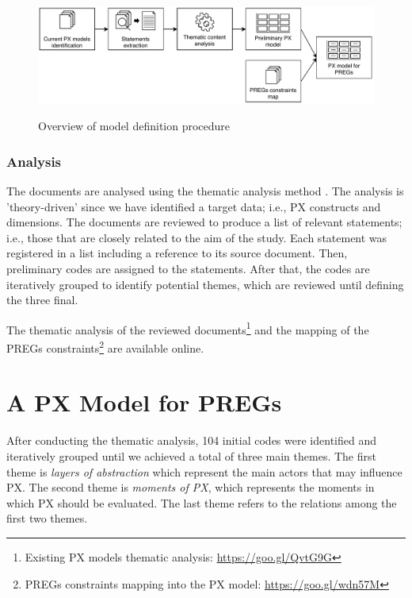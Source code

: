 \begin{figure}[bth]
\myfloatalign
{\includegraphics[width=\linewidth]{gfx/model/modelDefiniton}} \quad
\caption{Overview of model definition procedure}\label{fig:modelDefiniton}
\end{figure}

\subsubsection{Analysis}
The documents are analysed using the thematic analysis method \autocite{Braun}. The analysis is 'theory-driven' since we have identified a target data; i.e., \ac{PX} constructs and dimensions. The documents are reviewed to produce a list of relevant statements; i.e., those that are closely related to the aim of the study. Each statement was registered in a list including a reference to its source document. Then, preliminary codes are assigned to the statements. After that, the codes are iteratively grouped to identify potential themes, which are reviewed until defining the three final.

The thematic analysis of the reviewed documents\footnote{Existing \ac{PX} models thematic analysis: \url{https://goo.gl/QvtG9G}} and the mapping of the \acp{PREG} constraints\footnote{PREGs constraints mapping into the \ac{PX} model: \url{https://goo.gl/wdn57M}} are available online.

\section{A PX Model for PREGs} %
\label{sec:preg_px_model}
After conducting the thematic analysis, 104 initial codes were identified and iteratively grouped until we achieved a total of three main themes. The first theme is \textit{layers of abstraction} which represent the main actors that may influence \ac{PX}. The second theme is \textit{moments of \ac{PX}}, which represents the moments in which \ac{PX} should be evaluated. The last theme refers to the relations among the first two themes.


